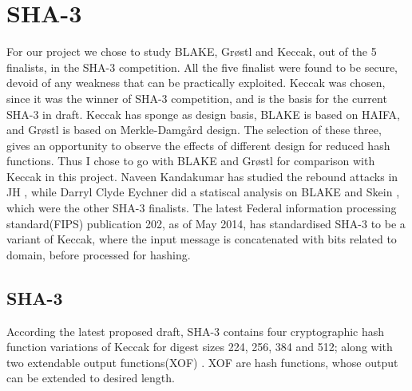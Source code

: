 \chapter{SHA-3}

For our project we chose to study BLAKE, Gr{\o}stl and Keccak, out of the 5 finalists, in the SHA-3 competition. 
All the five finalist were found to be secure, devoid of any weakness that can be practically exploited. Keccak
was chosen, since it was the winner of SHA-3 competition, and is the basis for the current SHA-3 in draft.
Keccak has sponge as design basis, BLAKE is based on HAIFA, and Gr{\o}stl
is based on Merkle-Damg\r{a}rd design. The selection of these three, gives an opportunity to observe the effects 
of different design for reduced hash functions. Thus I chose to go with BLAKE and Gr{\o}stl for comparison with
Keccak in this project. Naveen Kandakumar has studied the rebound attacks in JH \cite{00043}, while Darryl
Clyde Eychner did a statiscal analysis on BLAKE and Skein \cite{00030}, which were the other SHA-3 finalists. The
latest Federal information processing standard(FIPS) publication 202, as of May 2014, has standardised SHA-3 to
be a variant of Keccak, where the input message is concatenated with bits related to domain, before processed 
for hashing.

\section{SHA-3}

According the latest proposed draft, SHA-3 contains four cryptographic hash function variations of Keccak for digest 
sizes 224, 256, 384 and 512; along with two extendable output functions(XOF) \cite{00042}. XOF are hash functions,
whose output can be extended to desired length.

